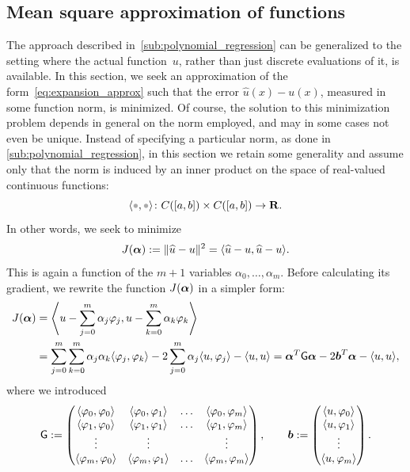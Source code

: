 \subsection{Mean square approximation of functions}
\label{sub:mean_square_approximation}
The approach described in~\cref{sub:polynomial_regression} can be generalized to the setting where the actual function~$u$,
rather than just discrete evaluations of it, is available.
In this section, we seek an approximation of the form~\eqref{eq:expansion_approx}
such that the error $\widehat u(x) - u(x)$, measured in some function norm,
is minimized.
Of course, the solution to this minimization problem depends in general on the norm employed,
and may in some cases not even be unique.
Instead of specifying a particular norm,
as done in \cref{sub:polynomial_regression},
in this section we retain some generality and assume only that the norm is induced by an inner product on the space of real-valued continuous functions:
\begin{equation}
    \label{eq:inner_product_approx}
    \ip{\placeholder,\placeholder} \colon C([a,b]) \times C([a, b]) \to \real.
\end{equation}
In other words,
we seek to minimize
\[
    J(\vect \alpha) := \norm{\widehat u - u}^2 = \ip{\widehat u - u, \widehat u - u}.
\]
This is again a function of the $m+1$ variables $\alpha_0, \dotsc, \alpha_m$.
Before calculating its gradient,
we rewrite the function $J(\vect \alpha)$ in a simpler form:
\begin{align*}
    J(\vect \alpha)
    &= \ip*{u - \sum_{j=0}^{m} \alpha_j \varphi_j,u - \sum_{k=0}^{m} \alpha_k \varphi_k} \\
    &= \sum_{j=0}^{m} \sum_{k=0}^{m} \alpha_j \alpha_k \ip{\varphi_j,\varphi_k}- 2 \sum_{j=0}^{m} \alpha_j \ip{u,\varphi_j} - \ip{u,u}
    = \vect \alpha^\t \mat G \vect \alpha - 2 \vect b^\t \vect \alpha - \ip{u,u},
\end{align*}
where we introduced
\begin{equation}
    \label{eq:approx_matrix_m}
    \mat G :=
    \begin{pmatrix}
        \ip{\varphi_0, \varphi_0} & \ip{\varphi_0, \varphi_1} & \hdots & \ip{\varphi_0, \varphi_m} \\
        \ip{\varphi_1, \varphi_0} & \ip{\varphi_1, \varphi_1} & \hdots & \ip{\varphi_1, \varphi_m} \\
        \vdots & \vdots & & \vdots \\
        \ip{\varphi_m, \varphi_0} & \ip{\varphi_m, \varphi_1} & \hdots & \ip{\varphi_m, \varphi_m}
    \end{pmatrix},
    \qquad
    \vect b :=
    \begin{pmatrix}
        \ip{u, \varphi_0} \\
        \ip{u, \varphi_1} \\
        \vdots \\
        \ip{u, \varphi_m} \\
    \end{pmatrix}.
\end{equation}
